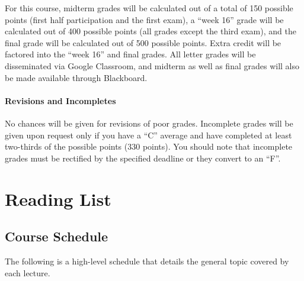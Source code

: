 \documentclass[]{book}
\begin{document}
For this course, midterm grades will be calculated out of a total of 150 possible points (first half participation and the first exam), a ``week 16'' grade will be calculated out of 400 possible points (all grades except the third exam), and the final grade will be calculated out of 500 possible points. Extra credit will be factored into the ``week 16'' and final grades. All letter grades will be disseminated via Google Classroom, and midterm as well as final grades will also be made available through Blackboard.

\hypertarget{revisions-and-incompletes}{%
\subsection{Revisions and Incompletes}\label{revisions-and-incompletes}}

No chances will be given for revisions of poor grades. Incomplete grades will be given upon request only if you have a ``C'' average and have completed at least two-thirds of the possible points (330 points). You should note that incomplete grades must be rectified by the specified deadline or they convert to an ``F''.

\hypertarget{part-reading-list}{%
\part{Reading List}\label{part-reading-list}}

\hypertarget{course-schedule}{%
\chapter{Course Schedule}\label{course-schedule}}

The following is a high-level schedule that details the general topic covered by each lecture.
\end{document}
